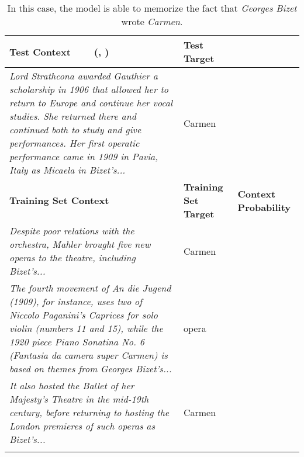 \documentclass{article} \usepackage{iclr2020_conference,times}
\begin{document}
\begin{table}[h]
\centering
\small
\begin{tabular}{p{9.5cm}>{\centering\arraybackslash}m{1.6cm}>{\centering\arraybackslash}m{1.6cm}}
        \toprule[1.5pt]
\textbf{Test Context} ~~~ (, )         & \textbf{Test Target}        &                     \\ \midrule[0.75pt]
\emph{Lord Strathcona awarded Gauthier a scholarship in 1906 that allowed her to return to Europe and continue her vocal studies. She returned there and continued both to study and give performances. Her first operatic performance came in 1909 in Pavia, Italy as Micaela in Bizet's...}                    & Carmen                    \\\addlinespace[0.15em]
                     \midrule[0.75pt]
\textbf{Training Set Context} & \textbf{Training Set Target} & \textbf{Context Probability} \\ 
                     \midrule[0.75pt]
\emph{Despite poor relations with the orchestra, Mahler brought five new operas to the theatre, including Bizet's...}  &  Carmen        &  0.356                   \\\addlinespace[0.5em]\emph{The fourth movement of An die Jugend (1909), for instance, uses two of Niccolo Paganini's Caprices for solo violin (numbers 11 and 15), while the 1920 piece Piano Sonatina No. 6 (Fantasia da camera super Carmen) is based on themes from Georges Bizet's...}  &  opera        &  0.0937                   \\\addlinespace[0.5em]\emph{It also hosted the Ballet of her Majesty's Theatre in the mid-19th century, before returning to hosting the London premieres of such operas as Bizet's...}  &  Carmen        &  0.0686                   \\\addlinespace[0.5em]\bottomrule[1.5pt]
\end{tabular}
    \caption{In this case, the model is able to memorize the fact that \emph{Georges Bizet} wrote \emph{Carmen}.}
    \label{table:app_output}
\end{table}
\end{document}
